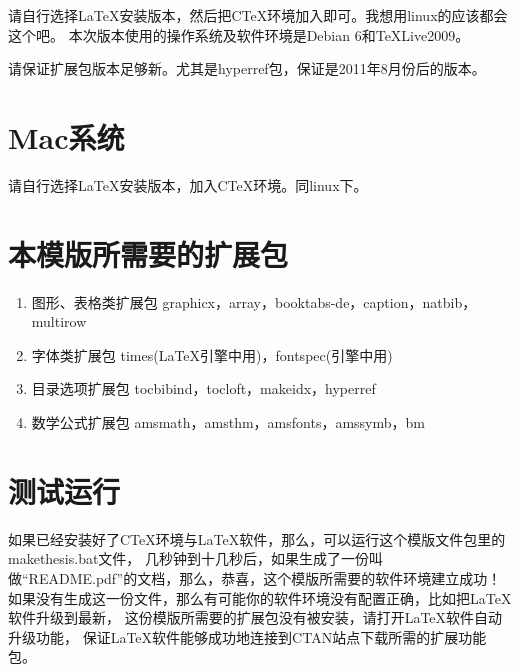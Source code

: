 请自行选择\LaTeX 安装版本，然后把CTeX环境加入即可。我想用linux的应该都会这个吧。
本次版本使用的操作系统及软件环境是Debian 6和TeXLive2009。

请保证扩展包版本足够新。尤其是hyperref包，保证是2011年8月份后的版本。

\section{Mac系统}

请自行选择\LaTeX 安装版本，加入CTeX环境。同linux下。

\section{本模版所需要的扩展包}

\begin{enumerate}

\item{图形、表格类扩展包} graphicx，array，booktabs-de，caption，natbib，multirow

\item{字体类扩展包} times(\LaTeX{}引擎中用)，fontspec(\XeTeX{}引擎中用)

\item{目录选项扩展包} tocbibind，tocloft，makeidx，hyperref

\item{数学公式扩展包} amsmath，amsthm，amsfonts，amssymb，bm

\end{enumerate}

\section{测试运行}

如果已经安装好了CTeX环境与\LaTeX 软件，那么，可以运行这个模版文件包里的makethesis.bat文件，
几秒钟到十几秒后，如果生成了一份叫做“README.pdf”的文档，那么，恭喜，这个模版所需要的软件环境建立成功！
如果没有生成这一份文件，那么有可能你的软件环境没有配置正确，比如把\LaTeX 软件升级到最新，
这份模版所需要的扩展包没有被安装，请打开\LaTeX 软件自动升级功能，
保证\LaTeX 软件能够成功地连接到CTAN站点下载所需的扩展功能包。
